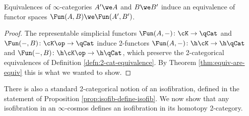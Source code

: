   \begin{corollary}\label{cor:equiv-invar-fun}
     Equivalences of $\infty$-categories $A' \we A$ and $B \we B'$ induce an equivalence of functor spaces $\Fun(A,B) \we \Fun(A',B')$.
  \end{corollary}
  \begin{proof}
  The representable simplicial functors $\Fun(A,-)\colon \cK \to \qCat$ and $\Fun(-,B)\colon \cK\op \to \qCat$ induce 2-functors $\Fun(A,-)\colon\h\cK\to\h\qCat$ and $\Fun(-,B)\colon\h\cK\op\to\h\qCat$, which preserve the 2-cat\-e\-go\-ri\-cal equivalences of Definition \ref{defn:2-cat-equivalence}. By Theorem \ref{thm:equiv-are-equiv} this is what we wanted to show.
  \end{proof}

  There is also a standard 2-categorical notion of an isofibration, defined in the statement of Proposition \ref{prop:isofib-define-isofib}. %
  We now show that any isofibration in an $\infty$-cosmos defines an isofibration in its homotopy 2-category.

